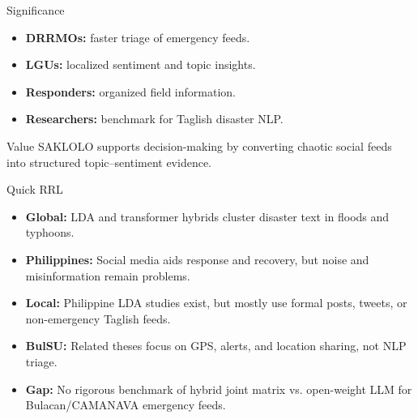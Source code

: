 \documentclass[aspectratio=169,10pt]{beamer}
\begin{document}
	
	\begin{frame}{Significance}
		
		\begin{itemize}
			\item \textbf{DRRMOs:} faster triage of emergency feeds.
			\item \textbf{LGUs:} localized sentiment and topic insights.
			\item \textbf{Responders:} organized field information.
			\item \textbf{Researchers:} benchmark for Taglish disaster NLP.
		\end{itemize}
		
		\vspace{1mm}
		
		\begin{block}{Value}
			SAKLOLO supports decision-making by converting chaotic social feeds into structured topic--sentiment evidence.
		\end{block}
		
	\end{frame}
	
	
	\begin{frame}{Quick RRL}
		
		\begin{itemize}
			\item \textbf{Global:} LDA and transformer hybrids cluster disaster text in floods and typhoons.
			\item \textbf{Philippines:} Social media aids response and recovery, but noise and misinformation remain problems.
			\item \textbf{Local:} Philippine LDA studies exist, but mostly use formal posts, tweets, or non-emergency Taglish feeds.
			\item \textbf{BulSU:} Related theses focus on GPS, alerts, and location sharing, not NLP triage.
			\item \textbf{Gap:} No rigorous benchmark of hybrid joint matrix vs. open-weight LLM for Bulacan/CAMANAVA emergency feeds.
		\end{itemize}
		
	\end{frame}
	
\end{document}
